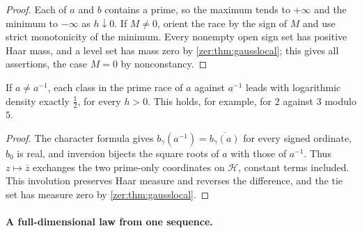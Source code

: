 \begin{proof}
Each of $a$ and $b$ contains a prime, so the maximum tends to $+\infty$ and the minimum to $-\infty$
as $h\downarrow0$. If $M\ne0$, orient the race by the sign of $M$ and use strict monotonicity of the
minimum. Every nonempty open sign set has positive Haar mass, and a level set has mass zero by
\cref{zer:thm:gausslocal}; this gives all assertions, the case $M=0$ by nonconstancy.
\end{proof}

\begin{corollary}\label{zer:cor:gaussinversion}
If $a\ne a^{-1}$, each class in the prime race of $a$ against $a^{-1}$ leads with logarithmic
density exactly $\tfrac12$, for every $h>0$. This holds, for example, for $2$ against $3$ modulo $5$.
\end{corollary}
\begin{proof}
The character formula gives $b_\gamma(a^{-1})=\overline{b_\gamma(a)}$ for every signed ordinate, $b_0$
is real, and inversion bijects the square roots of $a$ with those of $a^{-1}$. Thus
$z\mapsto\overline z$ exchanges the two prime-only coordinates on $\mathcal H$, constant terms
included. This involution preserves Haar measure and reverses the difference, and the tie set has
measure zero by \cref{zer:thm:gausslocal}.
\end{proof}

\paragraph{A full-dimensional law from one sequence.}


